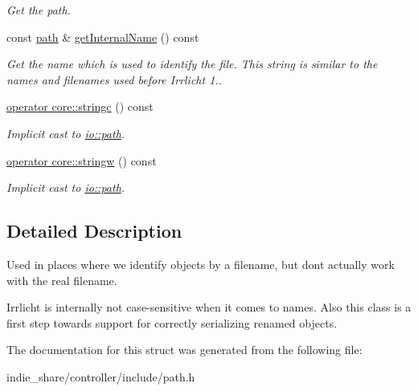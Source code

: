 \begin{DoxyCompactItemize}
\begin{DoxyCompactList}\small\item\em Get the path. \end{DoxyCompactList}\item 
\mbox{\label{structirr_1_1io_1_1SNamedPath_aca15cc5d5d79fc11927331c1c2108cb2}} 
const \hyperlink{namespaceirr_1_1io_ab1bdc45edb3f94d8319c02bc0f840ee1}{path} \& \hyperlink{structirr_1_1io_1_1SNamedPath_aca15cc5d5d79fc11927331c1c2108cb2}{get\+Internal\+Name} () const
\begin{DoxyCompactList}\small\item\em Get the name which is used to identify the file. This string is similar to the names and filenames used before Irrlicht 1.. \end{DoxyCompactList}\item 
\mbox{\label{structirr_1_1io_1_1SNamedPath_a414604db7696d60f759e645beee928c8}} 
\hyperlink{structirr_1_1io_1_1SNamedPath_a414604db7696d60f759e645beee928c8}{operator core\+::stringc} () const
\begin{DoxyCompactList}\small\item\em Implicit cast to \hyperlink{namespaceirr_1_1io_ab1bdc45edb3f94d8319c02bc0f840ee1}{io\+::path}. \end{DoxyCompactList}\item 
\mbox{\label{structirr_1_1io_1_1SNamedPath_abe0d6bc5cf1c59bc90ea9d98750a8976}} 
\hyperlink{structirr_1_1io_1_1SNamedPath_abe0d6bc5cf1c59bc90ea9d98750a8976}{operator core\+::stringw} () const
\begin{DoxyCompactList}\small\item\em Implicit cast to \hyperlink{namespaceirr_1_1io_ab1bdc45edb3f94d8319c02bc0f840ee1}{io\+::path}. \end{DoxyCompactList}\end{DoxyCompactItemize}


\subsection{Detailed Description}
Used in places where we identify objects by a filename, but don\textquotesingle{}t actually work with the real filename. 

Irrlicht is internally not case-\/sensitive when it comes to names. Also this class is a first step towards support for correctly serializing renamed objects. 

The documentation for this struct was generated from the following file\+:\begin{DoxyCompactItemize}
\item 
indie\+\_\+share/controller/include/path.\+h\end{DoxyCompactItemize}
